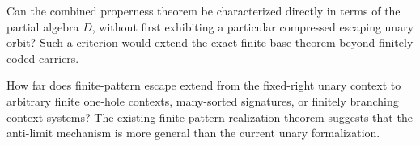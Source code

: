 \begin{openquestion}
Can the combined properness theorem be characterized directly in terms of the
partial algebra $D$, without first exhibiting a particular compressed escaping
unary orbit?  Such a criterion would extend the exact finite-base theorem
beyond finitely coded carriers.
\end{openquestion}

\begin{openquestion}
How far does finite-pattern escape extend from the fixed-right unary context to
arbitrary finite one-hole contexts, many-sorted signatures, or finitely
branching context systems?  The existing finite-pattern realization theorem
suggests that the anti-limit mechanism is more general than the current unary
formalization.
\end{openquestion}
